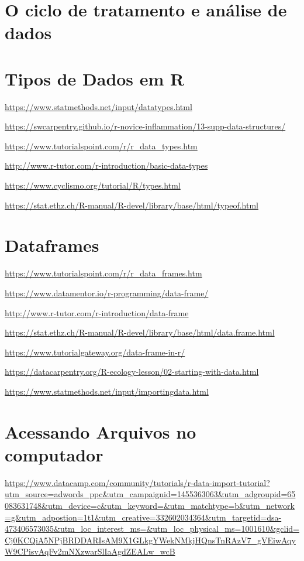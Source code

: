 \documentclass[12pt,a4paper,oneside]{erdc}
\begin{document}
\section{O ciclo de tratamento e análise de dados}

\section{Tipos de Dados em R}

\url{https://www.statmethods.net/input/datatypes.html}

\url{https://swcarpentry.github.io/r-novice-inflammation/13-supp-data-structures/}

\url{https://www.tutorialspoint.com/r/r_data_types.htm}

\url{http://www.r-tutor.com/r-introduction/basic-data-types}

\url{https://www.cyclismo.org/tutorial/R/types.html}

\url{https://stat.ethz.ch/R-manual/R-devel/library/base/html/typeof.html}

\section{Dataframes}

\url{https://www.tutorialspoint.com/r/r_data_frames.htm}

\url{https://www.datamentor.io/r-programming/data-frame/}

\url{http://www.r-tutor.com/r-introduction/data-frame}

\url{https://stat.ethz.ch/R-manual/R-devel/library/base/html/data.frame.html}

\url{https://www.tutorialgateway.org/data-frame-in-r/}

\url{https://datacarpentry.org/R-ecology-lesson/02-starting-with-data.html}

\url{https://www.statmethods.net/input/importingdata.html}

\section{Acessando Arquivos no computador}

\url{https://www.datacamp.com/community/tutorials/r-data-import-tutorial?utm_source=adwords_ppc&utm_campaignid=1455363063&utm_adgroupid=65083631748&utm_device=c&utm_keyword=&utm_matchtype=b&utm_network=g&utm_adpostion=1t1&utm_creative=332602034364&utm_targetid=dsa-473406573035&utm_loc_interest_ms=&utm_loc_physical_ms=1001610&gclid=Cj0KCQiA5NPjBRDDARIsAM9X1GLkgYWekNMkjHQnsTnRAzV7_gVEiwAqyW9CPisvAqFv2mNXzwarSlIaAgdZEALw_wcB}
\end{document}
